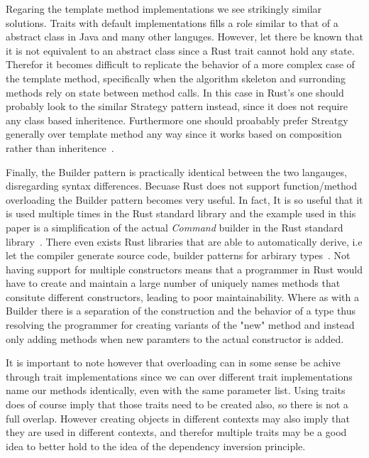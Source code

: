 \documentclass[conference]{IEEEtran}
\begin{document}
Regaring the template method implementations we see strikingly similar solutions.
Traits with default implementations fills a role similar to that of a abstract class in Java and many other languges.
However, let there be known that it is not equivalent to an abstract class since a Rust trait cannot hold any state.
Therefor it becomes difficult to replicate the behavior of a more complex case of the template method, specifically when the algorithm skeleton and surronding methods rely on state between method calls.
In this case in Rust's one should probably look to the similar Strategy pattern instead, since it does not require any class based inheritence.
Furthermore one should proabably prefer Streatgy generally over template method any way since it works based on composition rather than inheritence~\cite[p.32]{gamma1993:gof}.

Finally, the Builder pattern is practically identical between the two langauges, disregarding syntax differences.
Becuase Rust does not support function/method overloading the Builder pattern becomes very useful.
In fact, It is so useful that it is used multiple times in the Rust standard library and the example used in this paper is a simplification of the actual \emph{Command} builder in the Rust standard library~\cite{rustdoc:command}.
There even exists Rust libraries that are able to automatically derive, i.e let the compiler generate source code, builder patterns for arbirary types~\cite{cratesio:builder}.
Not having support for multiple constructors means that a programmer in Rust would have to create and maintain a large number of uniquely names methods that consitute different constructors, leading to poor maintainability.
Where as with a Builder there is a separation of the construction and the behavior of a type thus resolving the programmer for creating variants of the "new" method and instead only adding methods when new paramters to the actual constructor is added.

It is important to note however that overloading can in some sense be achive through trait implementations since we can over different trait implementations name our methods identically, even with the same parameter list.
Using traits does of course imply that those traits need to be created also, so there is not a full overlap.
However creating objects in different contexts may also imply that they are used in different contexts, and therefor multiple traits may be a good idea to better hold to the idea of the dependency inversion principle.
\end{document}

